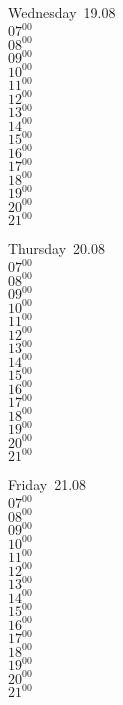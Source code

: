 \documentclass[11pt,a4paper]{book}\usepackage[]{graphicx}\usepackage[]{color}
\begin{document}
\begin{weekdaybox}
  Wednesday~19.08\\
  { 
  \vfill
  $07^{00}$\\
$08^{00}$\\
$09^{00}$\\
$10^{00}$\\
$11^{00}$\\
$12^{00}$\\
$13^{00}$\\
$14^{00}$\\
$15^{00}$\\
$16^{00}$\\
$17^{00}$\\
$18^{00}$\\
$19^{00}$\\
$20^{00}$\\
$21^{00}$\\
  }
\end{weekdaybox}
\clearpage
\begin{headerbox}
\end{headerbox}
\begin{weekdaybox}
  Thursday~20.08\\
  { 
  \vfill
  $07^{00}$\\
$08^{00}$\\
$09^{00}$\\
$10^{00}$\\
$11^{00}$\\
$12^{00}$\\
$13^{00}$\\
$14^{00}$\\
$15^{00}$\\
$16^{00}$\\
$17^{00}$\\
$18^{00}$\\
$19^{00}$\\
$20^{00}$\\
$21^{00}$\\
  }
\end{weekdaybox} 
\begin{weekdaybox}
  Friday~21.08\\
  { 
  \vfill
  $07^{00}$\\
$08^{00}$\\
$09^{00}$\\
$10^{00}$\\
$11^{00}$\\
$12^{00}$\\
$13^{00}$\\
$14^{00}$\\
$15^{00}$\\
$16^{00}$\\
$17^{00}$\\
$18^{00}$\\
$19^{00}$\\
$20^{00}$\\
$21^{00}$\\
  }
\end{weekdaybox}
\end{document}
